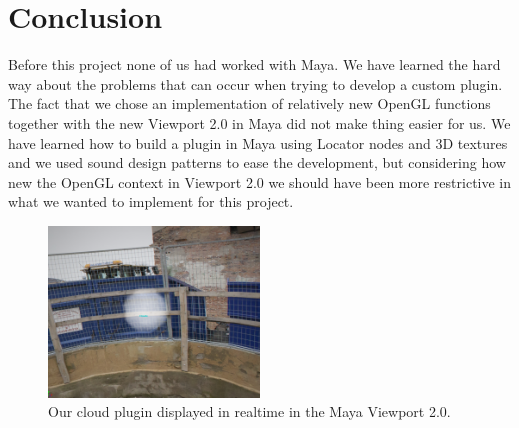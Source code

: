 \documentclass[11pt,twocolumn]{article}
\begin{document}
\section{Conclusion}
Before this project none of us had worked with Maya.
We have learned the hard way about the problems that can occur when trying to develop a custom plugin.
The fact that we chose an implementation of relatively new OpenGL functions together with the new Viewport 2.0 in Maya did not make thing easier for us.
We have learned how to build a plugin in Maya using Locator nodes and 3D textures and we used sound design patterns to ease the development, but considering how new the OpenGL context in Viewport 2.0 we should have been more restrictive in what we wanted to implement for this project.

\begin{figure}
\includegraphics[width=0.5\textwidth]{figures/cloudlol.png}
\caption{Our cloud plugin displayed in realtime in the Maya Viewport 2.0.}
\label{fig:mayaviewport_final}
\end{figure}

\endgroup
\newpage

\nocite{*}

\end{document}

